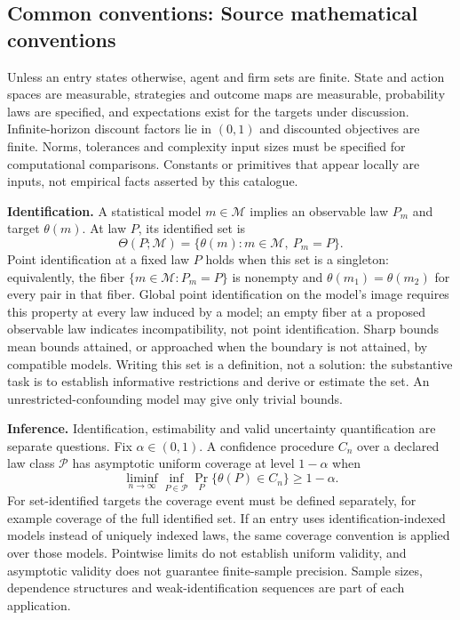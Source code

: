 \documentclass[11pt,a4paper]{article}
\begin{document}
\subsection*{Common conventions: Source mathematical conventions}

Unless an entry states otherwise, agent and firm sets are finite. State and action spaces are measurable, strategies and outcome maps are measurable, probability laws are specified, and expectations exist for the targets under discussion. Infinite-horizon discount factors lie in $(0,1)$ and discounted objectives are finite. Norms, tolerances and complexity input sizes must be specified for computational comparisons. Constants or primitives that appear locally are inputs, not empirical facts asserted by this catalogue.

\textbf{Identification.} A statistical model $m\in\mathcal M$ implies an observable law $P_m$ and target $\theta(m)$. At law $P$, its identified set is
\[
\Theta(P;\mathcal M)=\{\theta(m):m\in\mathcal M,\ P_m=P\}.
\]
Point identification at a fixed law $P$ holds when this set is a singleton: equivalently, the fiber $\{m\in\mathcal M:P_m=P\}$ is nonempty and $\theta(m_1)=\theta(m_2)$ for every pair in that fiber. Global point identification on the model's image requires this property at every law induced by a model; an empty fiber at a proposed observable law indicates incompatibility, not point identification. Sharp bounds mean bounds attained, or approached when the boundary is not attained, by compatible models. Writing this set is a definition, not a solution: the substantive task is to establish informative restrictions and derive or estimate the set. An unrestricted-confounding model may give only trivial bounds.

\textbf{Inference.} Identification, estimability and valid uncertainty quantification are separate questions. Fix $\alpha\in(0,1)$. A confidence procedure $C_n$ over a declared law class $\mathcal P$ has asymptotic uniform coverage at level $1-\alpha$ when
\[
\liminf_{n\to\infty}\inf_{P\in\mathcal P}\Pr_P\{\theta(P)\in C_n\}\geq1-\alpha.
\]
For set-identified targets the coverage event must be defined separately, for example coverage of the full identified set. If an entry uses identification-indexed models instead of uniquely indexed laws, the same coverage convention is applied over those models. Pointwise limits do not establish uniform validity, and asymptotic validity does not guarantee finite-sample precision. Sample sizes, dependence structures and weak-identification sequences are part of each application.
\end{document}
